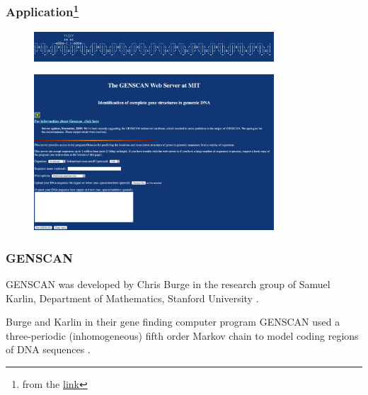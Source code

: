 \documentclass{beamer}
\begin{document}
\begin{frame}
    \frametitle{Application\footnote{from the \href{http://hollywood.mit.edu/GENSCANinfo.html}{link}}}
    
    \begin{figure}[T]
        \includegraphics[width=0.8\textwidth]{img/5.png}
        \end{figure}
    \begin{figure}[T]
        \includegraphics[width=0.8\textwidth]{img/6.png}
        \end{figure}

    \end{frame}
\begin{frame}
    \frametitle{GENSCAN}
    GENSCAN was developed by Chris Burge in the research group of Samuel Karlin, Department of Mathematics, Stanford University \cite{burge1997prediction,salzberg1998modeling}. 

    Burge and Karlin in their gene finding computer program GENSCAN used a three-periodic (inhomogeneous) fifth order Markov chain to model coding regions of DNA sequences \cite{borodovsky2006problems}.
\end{frame}
\end{document}
